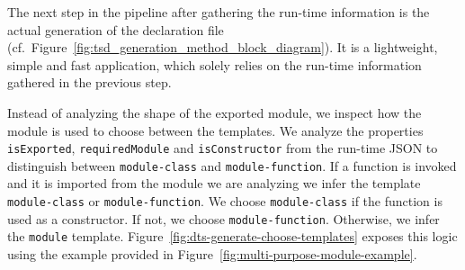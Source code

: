 \documentclass[a4paper,english,cleveref, autoref]{lipics-v2019}
\newcommand{\figref}[1]{Figure~\ref{#1}}
\begin{document}
The next step in the pipeline after gathering the run-time information is
the actual generation of the declaration file (cf.\
\figref{fig:tsd_generation_method_block_diagram}). It is a lightweight,
simple and fast application, which solely relies on the run-time
information gathered in the previous step.

Instead of analyzing the shape of the exported module, we inspect how the module is used to choose between the templates. We analyze the properties \texttt{isExported}, \texttt{requiredModule} and \texttt{isConstructor} from the run-time JSON to distinguish between \texttt{module-class} and \texttt{module-function}. If a function is invoked and it is imported from the module we are analyzing we infer the template \texttt{module-class} or \texttt{module-function}. We choose \texttt{module-class} if the function is used as a constructor. If not, we choose \texttt{module-function}. Otherwise, we infer the \texttt{module} template. \figref{fig:dts-generate-choose-templates} exposes this logic using the example provided in \figref{fig:multi-purpose-module-example}.
\end{document}

